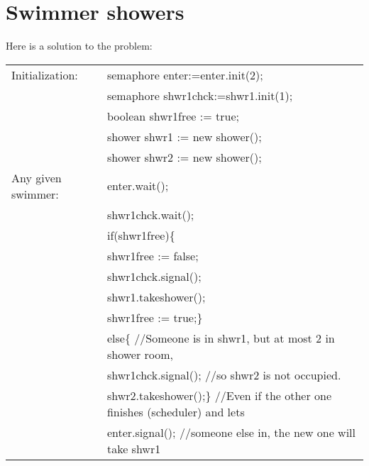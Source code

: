 \documentclass[10pt,a4paper]{article}
\begin{document}
\section{Swimmer showers}

Here is a solution to the problem:\\

\begin{tabular}{|ll|}\hline
Initialization:     &semaphore enter:=enter.init(2);\\
                    &semaphore shwr1chck:=shwr1.init(1);\\
                    &boolean shwr1free := true;\\
                    &shower shwr1 := new shower();\\
                    &shower shwr2 := new shower();\\ \hline
Any given swimmer:  &enter.wait();\\
                    &shwr1chck.wait();\\
                    &if(shwr1free)\{\\
                    &\quad shwr1free := false;  \\
                    &\quad shwr1chck.signal();\\
                    &\quad shwr1.takeshower();\\
                    &\quad shwr1free := true;\}\\
                    &else\{ {\color{blue} //Someone is in shwr1, but at most 2 in shower room,}\\
                    &\quad shwr1chck.signal(); {\color{blue} //so shwr2 is not occupied.}\\
                    &\quad shwr2.takeshower();\} {\color{blue} //Even if the other one finishes (scheduler) and lets}\\
                    &enter.signal(); {\color{blue} //someone else in, the new one will take shwr1}\\ \hline
\end{tabular}
\end{document}
